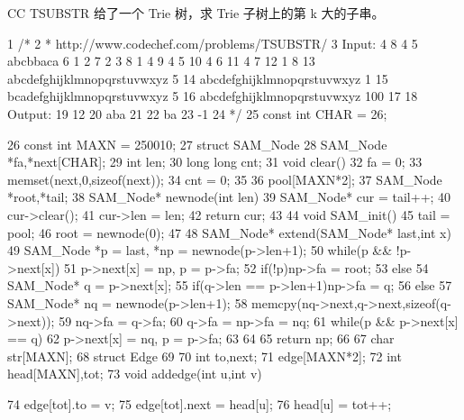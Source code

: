\documentclass[11pt]{article}
\begin{document}
\begin{Code}
     CC TSUBSTR
     给了一个 Trie 树，求 Trie 子树上的第 k 大的子串。

 1   /*
 2    * http://www.codechef.com/problems/TSUBSTR/
 3   Input:
 4   8 4
 5   abcbbaca
 6   1 2
 7   2 3
 8   1 4
 9   4 5
10   4 6
11   4 7
12   1 8
13   abcdefghijklmnopqrstuvwxyz 5
14   abcdefghijklmnopqrstuvwxyz 1
15   bcadefghijklmnopqrstuvwxyz 5
16   abcdefghijklmnopqrstuvwxyz 100
17
18   Output:
19   12
20   aba
21
22   ba
23   -1
24    */
25   const int CHAR = 26;


26   const int MAXN = 250010;
27   struct SAM_Node{
28       SAM_Node *fa,*next[CHAR];
29       int len;
30       long long cnt;
31       void clear(){
32           fa = 0;
33           memset(next,0,sizeof(next));
34           cnt = 0;
35       }
36   }pool[MAXN*2];
37   SAM_Node *root,*tail;
38   SAM_Node* newnode(int len){
39       SAM_Node* cur = tail++;
40       cur->clear();
41       cur->len = len;
42       return cur;
43   }
44   void SAM_init(){
45       tail = pool;
46       root = newnode(0);
47   }
48   SAM_Node* extend(SAM_Node* last,int x){
49       SAM_Node *p = last, *np = newnode(p->len+1);
50       while(p && !p->next[x])
51           p->next[x] = np, p = p->fa;
52       if(!p)np->fa = root;
53       else {
54           SAM_Node* q = p->next[x];
55           if(q->len == p->len+1)np->fa = q;
56           else {
57                SAM_Node* nq = newnode(p->len+1);
58                memcpy(nq->next,q->next,sizeof(q->next));
59                nq->fa = q->fa;
60                q->fa = np->fa = nq;
61                while(p && p->next[x] == q)
62                    p->next[x] = nq, p = p->fa;
63           }
64       }
65       return np;
66   }
67   char str[MAXN];
68   struct Edge
69   {
70       int to,next;
71   }edge[MAXN*2];
72   int head[MAXN],tot;
73   void addedge(int u,int v){
74       edge[tot].to = v;
75       edge[tot].next = head[u];
76       head[u] = tot++;


}
\end{Code}
\end{document}
